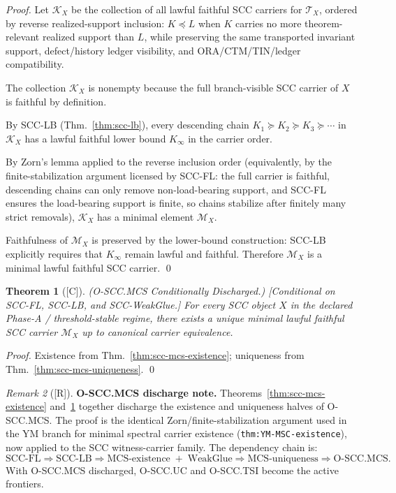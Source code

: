 \documentclass[12pt,oneside]{amsbook}
\theoremstyle{plain}
\newtheorem{theorem}{Theorem}[section]
\theoremstyle{definition}
\theoremstyle{remark}
\newtheorem{remark}[theorem]{Remark}
\newcommand{\status}[1]{\textup{[#1]}}
\begin{document}
\begin{proof}
Let $\mathcal{K}_X$ be the collection of all lawful faithful SCC
carriers for $\mathcal{T}_X$, ordered by reverse realized-support
inclusion:
$K \preceq L$ when $K$ carries no more theorem-relevant realized
support than $L$, while preserving the same transported invariant
support, defect/history ledger visibility, and ORA/CTM/TIN/ledger
compatibility.

The collection $\mathcal{K}_X$ is nonempty because the full
branch-visible SCC carrier of $X$ is faithful by definition.

By SCC-LB (Thm.~\ref{thm:scc-lb}), every descending chain
$K_1 \succeq K_2 \succeq K_3 \succeq \cdots$
in $\mathcal{K}_X$ has a lawful faithful lower bound $K_\infty$
in the carrier order.

By Zorn's lemma applied to the reverse inclusion order (equivalently,
by the finite-stabilization argument licensed by SCC-FL: the full
carrier is faithful, descending chains can only remove non-load-bearing
support, and SCC-FL ensures the load-bearing support is finite, so
chains stabilize after finitely many strict removals), $\mathcal{K}_X$
has a minimal element $\mathcal{M}_X$.

Faithfulness of $\mathcal{M}_X$ is preserved by the lower-bound
construction: SCC-LB explicitly requires that $K_\infty$ remain
lawful and faithful. Therefore $\mathcal{M}_X$ is a minimal lawful
faithful SCC carrier.
\qed
\end{proof}

\begin{theorem}[\status{C}]\label{thm:scc-mcs}
\textup{(O-SCC.MCS Conditionally Discharged.)}
\textup{[Conditional on SCC-FL, SCC-LB, and SCC-WeakGlue.]}
For every SCC object $X$ in the declared Phase-A / threshold-stable
regime, there exists a unique minimal lawful faithful SCC carrier
$\mathcal{M}_X$ up to canonical carrier equivalence.
\end{theorem}

\begin{proof}
Existence from Thm.~\ref{thm:scc-mcs-existence};
uniqueness from Thm.~\ref{thm:scc-mcs-uniqueness}.
\qed
\end{proof}

\begin{remark}[\status{R}]\label{rem:scc-mcs-discharge-note}
\textbf{O-SCC.MCS discharge note.}
Theorems~\ref{thm:scc-mcs-existence} and~\ref{thm:scc-mcs}
together discharge the existence and uniqueness halves of
O-SCC.MCS. The proof is the identical Zorn/finite-stabilization
argument used in the YM branch for minimal spectral carrier existence
(\texttt{thm:YM-MSC-existence}), now applied to the SCC witness-carrier
family. The dependency chain is:
\[
 \mathrm{SCC\text{-}FL} \Rightarrow
 \mathrm{SCC\text{-}LB} \Rightarrow
 \mathrm{MCS\text{-}existence} \;+\;
 \mathrm{WeakGlue} \Rightarrow
 \mathrm{MCS\text{-}uniqueness} \Rightarrow
 \mathrm{O\text{-}SCC.MCS}.
\]
With O-SCC.MCS discharged, O-SCC.UC and O-SCC.TSI become the
active frontiers.
\end{remark}
\end{document}
